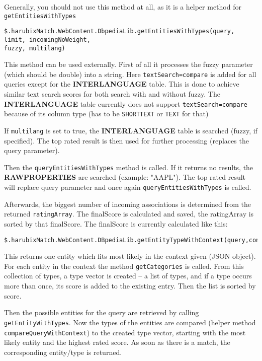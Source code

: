 Generally, you should not use this method at all, as it is a helper method for \texttt{getEntitiesWithTypes}

\scriptsize
\begin{verbatim}
$.harubixMatch.WebContent.DbpediaLib.getEntitiesWithTypes(query, limit, incomingNoWeight,
fuzzy, multilang)
\end{verbatim}
\normalsize

This method can be used externally. First of all it processes the fuzzy parameter (which should be double) into a string. Here \texttt{textSearch=compare} is added for all queries except for the \textbf{INTERLANGUAGE} table. This is done to achieve similar text search scores for both search with and without fuzzy. The \textbf{INTERLANGUAGE} table currently does not support \texttt{textSearch=compare} because of its column type (has to be \texttt{SHORTTEXT} or \texttt{TEXT} for that)

If \texttt{multilang} is set to true, the \textbf{INTERLANGUAGE} table is searched (fuzzy, if specified). The top rated result is then used for further processing (replaces the query parameter).

Then the \texttt{queryEntitiesWithTypes} method is called. If it returns no results, the \textbf{RAWPROPERTIES} are searched (example: "AAPL"). The top rated result will replace query parameter and once again \texttt{queryEntitiesWithTypes} is called.

Afterwards, the biggest number of incoming associations is determined from the returned \texttt{ratingArray}. The finalScore is calculated and saved, the ratingArray is sorted by that finalScore. The finalScore is currently calculated like this:

\scriptsize
\begin{verbatim}
$.harubixMatch.WebContent.DBpediaLib.getEntityTypeWithContext(query,context,limit)
\end{verbatim}
\normalsize

This returns one entity which fits most likely in the context given (JSON object). For each entity in the context the method \texttt{getCategories} is called. From this collection of types, a type vector is created – a list of types, and if a type occurs more than once, its score is added to the existing entry. Then the list is sorted by score.

Then the possible entities for the query are retrieved by calling \texttt{getEntityWithTypes}. Now the types of the entities are compared (helper method \texttt{compareQueryWithContext}) to the created type vector, starting with the most likely entity and the highest rated score. As soon as there is a match, the corresponding entity/type is returned.

